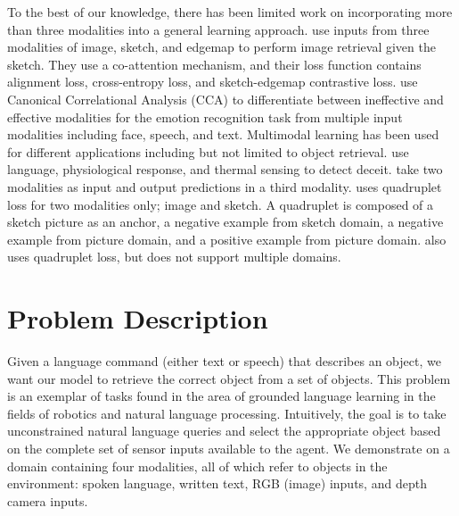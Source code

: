 \documentclass[sigconf,natbib=true,anonymous=true]{acmart}
\begin{document}
To the best of our knowledge, there has been limited work on incorporating more than three modalities into a general learning approach. \citet{semihet_three_way_Lei_2020} use inputs from three modalities of image, sketch, and edgemap to perform image retrieval given the sketch. They use a co-attention mechanism, and their loss function contains alignment loss, cross-entropy loss, and sketch-edgemap contrastive loss. \citet{Mittal2020M3ER} use Canonical Correlational Analysis (CCA) to differentiate between ineffective and effective modalities for the emotion recognition task from multiple input modalities including face, speech, and text. Multimodal learning has been used for different applications including but not limited to object retrieval. \citet{Deception_ICMI_2014} use language, physiological response, and thermal sensing to detect deceit. \citet{het_data_fusion_liu_IEEE_2017} take two modalities as input and output predictions in a third modality. \citet{tursun2021efficient} uses quadruplet loss for two modalities only; image and sketch. A quadruplet is composed of a sketch picture as an anchor, a negative example from sketch domain, a negative example from picture domain, and a positive example from picture domain. \citet{chen2017beyond} also uses quadruplet loss, but does not support multiple domains. 



\section{Problem Description}
\label{sec:Problem-Description}

Given a language command (either text or speech) that describes an object, we want our model to retrieve the correct object from a set of objects. This problem is an exemplar of tasks found in the area of grounded language learning in the fields of robotics and natural  language processing. Intuitively, the goal is to take unconstrained natural language queries and select the appropriate object based on the complete set of sensor inputs available to the agent. We demonstrate on a domain containing four modalities, all of which refer to objects in the environment: spoken language, written text, RGB (image) inputs, and depth camera inputs. 
\end{document}
